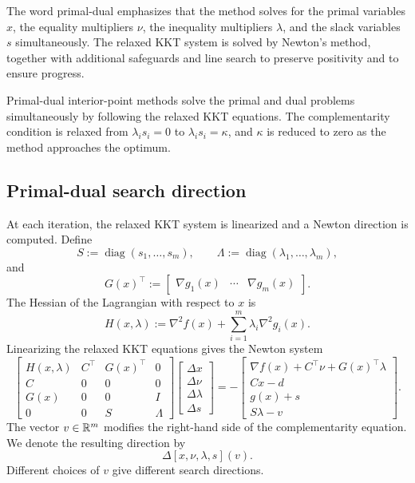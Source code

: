 The word primal-dual emphasizes that the method solves for the primal variables \(x\), the
equality multipliers \(\nu\), the inequality multipliers \(\lambda\), and the slack variables \(s\)
simultaneously. The relaxed KKT system is solved by Newton's method, together with additional
safeguards and line search to preserve positivity and to ensure progress.

\begin{theorembox}
Primal-dual interior-point methods solve the primal and dual problems simultaneously by
following the relaxed KKT equations. The complementarity condition is relaxed from
\(\lambda_i s_i=0\) to \(\lambda_i s_i=\kappa\), and \(\kappa\) is reduced to zero as the method
approaches the optimum.
\end{theorembox}

\subsection{Primal-dual search direction}

At each iteration, the relaxed KKT system is linearized and a Newton direction is computed.
Define
\[
    S:=\operatorname{diag}(s_1,\ldots,s_m),
    \qquad
    \Lambda:=\operatorname{diag}(\lambda_1,\ldots,\lambda_m),
\]
and
\[
    G(x)^\top
    :=
    \begin{bmatrix}
        \nabla g_1(x) & \cdots & \nabla g_m(x)
    \end{bmatrix}.
\]
The Hessian of the Lagrangian with respect to \(x\) is
\[
    H(x,\lambda)
    :=
    \nabla^2 f(x)
    +
    \sum_{i=1}^{m}
    \lambda_i\nabla^2 g_i(x).
\]
Linearizing the relaxed KKT equations gives the Newton system
\[
\begin{bmatrix}
    H(x,\lambda) & C^\top & G(x)^\top & 0\\
    C            & 0      & 0        & 0\\
    G(x)         & 0      & 0        & I\\
    0            & 0      & S        & \Lambda
\end{bmatrix}
\begin{bmatrix}
    \Delta x\\
    \Delta \nu\\
    \Delta \lambda\\
    \Delta s
\end{bmatrix}
=
-
\begin{bmatrix}
    \nabla f(x)+C^\top\nu+G(x)^\top\lambda\\
    Cx-d\\
    g(x)+s\\
    S\lambda-v
\end{bmatrix}.
\]
The vector \(v\in\mathbb{R}^m\) modifies the right-hand side of the complementarity equation. We denote
the resulting direction by
\[
    \Delta [x,\nu,\lambda,s](v).
\]
Different choices of \(v\) give different search directions.

